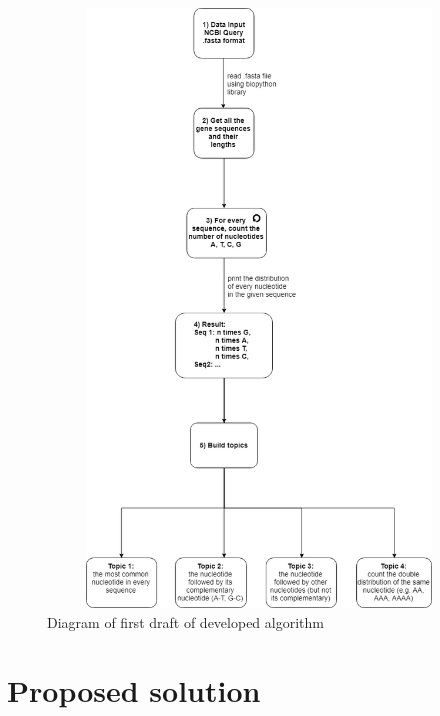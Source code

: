 \begin{figure}[htbp]
	\centering
	\includegraphics[width=1\textwidth, height=600px, keepaspectratio]{Image/creating_topics_algorithm.png}
	\caption{Diagram of first draft of developed algorithm}
	\label{algorithm_figure}
\end{figure}

\section{Proposed solution}\label{proposed_solution}

